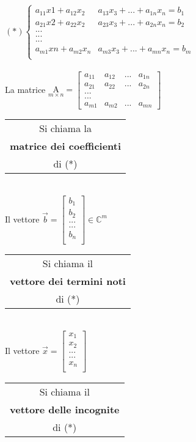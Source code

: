 $(*)
\begin{cases}
    a_{11}x1 + a_{12}x_2 & a_{13}x_3 + ... + a_{1n}x_n= b_1\\
    a_{21}x2 + a_{22}x_2 & a_{23}x_3 + ... + a_{2n}x_n= b_2\\
    ...\\
    ...\\
    ...\\
    a_{m1}xn + a_{m2}x_n & a_{m3}x_3 + ... + a_{mn}x_n= b_m\\
\end{cases}
$\\\\
La matrice $\underset{m\times n}{\textrm{A}}=
\begin{bmatrix}
    a_{11} & a_{12} & ... & a_{1n}\\
    a_{21} & a_{22} & ... & a_{2n}\\
    ...\\
    ...\\
    a_{m1} & a_{m2} & ... & a_{mn}
\end{bmatrix}
$
\begin{tabular}{c}
    Si chiama la \\
    \textbf{matrice dei coefficienti}\\
di (*)
\end{tabular}\\
Il vettore $\vec{b}=
\begin{bmatrix}
    b_1\\
    b_2\\
    ...\\
    ...\\
    b_n\\
\end{bmatrix}
\in\mathbb{C}^m
$
\begin{tabular}{c}
    Si chiama il \\
    \textbf{vettore dei termini noti}\\
di (*)
\end{tabular}\\
Il vettore $\vec{x}=
\begin{bmatrix}
    x_1\\
    x_2\\
    ...\\
    ...\\
    x_n\\
\end{bmatrix}
$
\begin{tabular}{c}
    Si chiama il \\
    \textbf{vettore delle incognite}\\
di (*)
\end{tabular}\\

